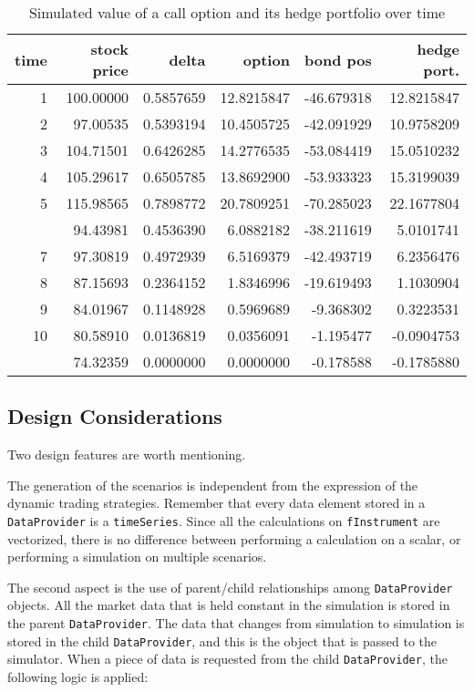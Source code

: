 \documentclass[justified]{tufte-book}
\newcommand{\class}[1]{\texttt{#1}}
\begin{document}
\begin{table}

\caption{\label{tab:delta-hedge-few-samples}Simulated value of a call option and its hedge portfolio over time}
\centering
\begin{tabular}[t]{rrrrrr}
\toprule
time & stock price & delta & option & bond pos & hedge port.\\
\midrule
1 & 100.00000 & 0.5857659 & 12.8215847 & -46.679318 & 12.8215847\\
2 & 97.00535 & 0.5393194 & 10.4505725 & -42.091929 & 10.9758209\\
3 & 104.71501 & 0.6426285 & 14.2776535 & -53.084419 & 15.0510232\\
4 & 105.29617 & 0.6505785 & 13.8692900 & -53.933323 & 15.3199039\\
5 & 115.98565 & 0.7898772 & 20.7809251 & -70.285023 & 22.1677804\\
\addlinespace
6 & 94.43981 & 0.4536390 & 6.0882182 & -38.211619 & 5.0101741\\
7 & 97.30819 & 0.4972939 & 6.5169379 & -42.493719 & 6.2356476\\
8 & 87.15693 & 0.2364152 & 1.8346996 & -19.619493 & 1.1030904\\
9 & 84.01967 & 0.1148928 & 0.5969689 & -9.368302 & 0.3223531\\
10 & 80.58910 & 0.0136819 & 0.0356091 & -1.195477 & -0.0904753\\
\addlinespace
11 & 74.32359 & 0.0000000 & 0.0000000 & -0.178588 & -0.1785880\\
\bottomrule
\end{tabular}
\end{table}

\hypertarget{design-considerations}{%
\subsection{Design Considerations}\label{design-considerations}}

Two design features are worth mentioning.

The generation of the scenarios is independent from the expression of
the dynamic trading strategies. Remember that every data element stored
in a \class{DataProvider} is a \class{timeSeries}. Since all the calculations on \class{fInstrument} are vectorized, there is no
difference between performing a calculation on a scalar, or performing a
simulation on multiple scenarios.

The second aspect is the use of parent/child relationships among
\class{DataProvider} objects. All the market data that is held constant in the simulation is
stored in the parent \class{DataProvider}. The data that changes from simulation to
simulation is stored in the child \class{DataProvider}, and this is the object that is
passed to the simulator. When a piece of data is requested from the
child \class{DataProvider}, the following logic is applied:
\end{document}
